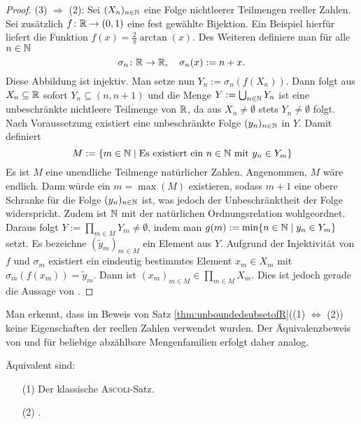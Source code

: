 \begin{proof}
  (3) $\Rightarrow$ (2):
  Sei $(X_n)_{n \in \mathbb{N}}$ eine Folge nichtleerer Teilmengen reeller Zahlen.
  Sei zusätzlich $f \colon \mathbb{R} \to (0,1)$ eine fest gewählte Bijektion.
  Ein Beispiel hierfür liefert die Funktion $f(x) = \frac{2}{\pi}\arctan(x)$.
  Des Weiteren definiere man für alle $n \in \mathbb{N}$
  \begin{displaymath}
    \sigma_n \colon \mathbb{R} \to \mathbb{R}, \quad \sigma_n(x) := n + x.
  \end{displaymath}
  Diese Abbildung ist injektiv.
  Man setze nun $Y_n := \sigma_n(f(X_n))$. 
  Dann folgt aus $X_n \subseteq \mathbb{R}$ sofort $Y_n \subseteq (n,n+1)$ und die Menge $Y:= \bigcup_{n \in \mathbb{N}} Y_n$ ist eine unbeschränkte nichtleere Teilmenge von $\mathbb{R}$, da aus $X_n \neq \emptyset$ stets $Y_n \neq \emptyset$ folgt.
  Nach Voraussetzung existiert eine unbeschränkte Folge $(y_n)_{n \in \mathbb{N}}$ in $Y$.
  Damit definiert
  \begin{displaymath}
    M := \{m \in \mathbb{N} \mid \text{Es existiert ein } n \in \mathbb{N} \text{ mit } y_n \in Y_m\}
  \end{displaymath}
  Es ist $M$ eine unendliche Teilmenge natürlicher Zahlen.
  Angenommen, $M$ wäre endlich.
  Dann würde ein $m = \max(M)$ existieren, sodass $m + 1$ eine obere Schranke für die Folge $(y_n)_{n \in \mathbb{N}}$ ist, was jedoch der Unbeschränktheit der Folge widerspricht.
  Zudem ist $\mathbb{N}$ mit der natürlichen Ordnungsrelation wohlgeordnet.
  Daraus folgt $Y := \prod_{m \in M} Y_m \neq \emptyset$, indem man $g(m) := \min\{n \in \mathbb{N} \mid y_n \in Y_m\}$ setzt.
  Es bezeichne $(\tilde{y}_m)_{m \in M}$ ein Element aus $Y$.
  Aufgrund der Injektivität von $f$ und $\sigma_m$ existiert ein eindeutig bestimmtes Element $x_m \in X_m$ mit $\sigma_m(f(x_m)) = \tilde{y}_m$.
  Dann ist $(x_m)_{m \in M} \in \prod_{m \in M} X_m$.
  Dies ist jedoch gerade die Aussage von \PCCR.
\end{proof}

\begin{bem}
  Man erkennt, dass im Beweis von Satz \ref{thm:unboundedsubsetofR}((1) $\Leftrightarrow$ (2)) keine Eigenschaften der reellen Zahlen verwendet wurden. Der Äquivalenzbeweis von \CC und \PCC für beliebige abzählbare Mengenfamilien erfolgt daher analog.
\end{bem}

\begin{thm}
  \label{thm:classicalascoli}
  Äquivalent sind:
  \begin{enumerate}
    \item[(1)] Der klassische \textsc{Ascoli}-Satz.
    \item[(2)] \CCR.
  \end{enumerate}
\end{thm}

